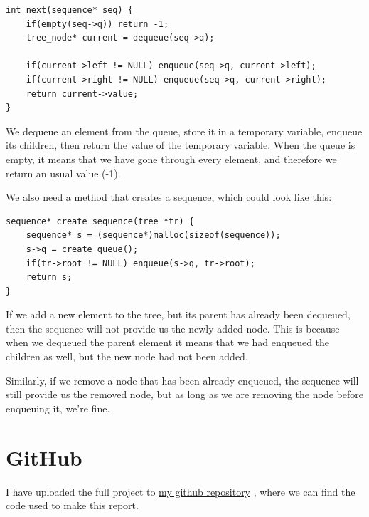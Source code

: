 \documentclass[a4paper,11pt]{article}
\newcommand{\underlinehref}[2]{%
    \href{#1}{\ul{#2}}%
}
\begin{document}
    \begin{verbatim}
int next(sequence* seq) {
    if(empty(seq->q)) return -1;
    tree_node* current = dequeue(seq->q);

    if(current->left != NULL) enqueue(seq->q, current->left);
    if(current->right != NULL) enqueue(seq->q, current->right);
    return current->value;
}
    \end{verbatim}

    We dequeue an element from the queue, store it in a temporary variable, enqueue its children, then return the value of the temporary variable.
    When the queue is empty, it means that we have gone through every element, and therefore we return an usual value (-1).

    We also need a method that creates a sequence, which could look like this:

    \begin{verbatim}
sequence* create_sequence(tree *tr) {
    sequence* s = (sequence*)malloc(sizeof(sequence));
    s->q = create_queue();
    if(tr->root != NULL) enqueue(s->q, tr->root);
    return s;
}
    \end{verbatim}

    If we add a new element to the tree, but its parent has already been dequeued, then the sequence will not provide us the newly added node.
    This is because when we dequeued the parent element it means that we had enqueued the children as well, but the new node had not been added.
    
    Similarly, if we remove a node that has been already enqueued, the sequence will still provide us the removed node, but as long as we are removing the node before enqueuing it, we're fine.

    \section*{GitHub}
    I have uploaded the full project to \underlinehref{https://github.com/peterherczku/ID1021/tree/main/assignment-7-C}{my github repository}, where we can find the code used to make this report.
\end{document}
